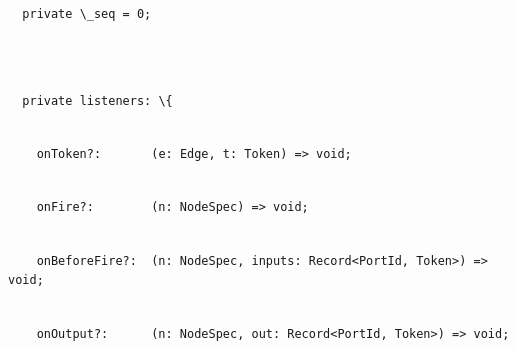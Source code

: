 \documentclass[
]{article}
\newcommand{\passthrough}[1]{#1}
\begin{document}
\passthrough{\lstinline!  !}\passthrough{\lstinline!private!}\passthrough{\lstinline! !}\passthrough{\lstinline!\_seq!}\passthrough{\lstinline! !}\passthrough{\lstinline!=!}\passthrough{\lstinline! !}\passthrough{\lstinline!0;!}\strut \\
\strut \\
\passthrough{\lstinline!  !}\passthrough{\lstinline!private!}\passthrough{\lstinline! !}\passthrough{\lstinline!listeners:!}\passthrough{\lstinline! !}\passthrough{\lstinline!\{!}\strut \\
\passthrough{\lstinline!    !}\passthrough{\lstinline!onToken!}\passthrough{\lstinline!?:!}\passthrough{\lstinline!       !}\passthrough{\lstinline!(e:!}\passthrough{\lstinline! !}\passthrough{\lstinline!Edge,!}\passthrough{\lstinline! !}\passthrough{\lstinline!t:!}\passthrough{\lstinline! !}\passthrough{\lstinline!Token)!}\passthrough{\lstinline! !}\passthrough{\lstinline!=>!}\passthrough{\lstinline! !}\passthrough{\lstinline!void;!}\strut \\
\passthrough{\lstinline!    !}\passthrough{\lstinline!onFire!}\passthrough{\lstinline!?:!}\passthrough{\lstinline!        !}\passthrough{\lstinline!(n:!}\passthrough{\lstinline! !}\passthrough{\lstinline!NodeSpec!}\passthrough{\lstinline!)!}\passthrough{\lstinline! !}\passthrough{\lstinline!=>!}\passthrough{\lstinline! !}\passthrough{\lstinline!void;!}\strut \\
\passthrough{\lstinline!    !}\passthrough{\lstinline!onBeforeFire!}\passthrough{\lstinline!?:!}\passthrough{\lstinline!  !}\passthrough{\lstinline!(n:!}\passthrough{\lstinline! !}\passthrough{\lstinline!NodeSpec!}\passthrough{\lstinline!,!}\passthrough{\lstinline! !}\passthrough{\lstinline!inputs:!}\passthrough{\lstinline! !}\passthrough{\lstinline!Record<!}\passthrough{\lstinline!PortId!}\passthrough{\lstinline!,!}\passthrough{\lstinline! !}\passthrough{\lstinline!Token>)!}\passthrough{\lstinline! !}\passthrough{\lstinline!=>!}\passthrough{\lstinline! !}\passthrough{\lstinline!void;!}\strut \\
\passthrough{\lstinline!    !}\passthrough{\lstinline!onOutput!}\passthrough{\lstinline!?:!}\passthrough{\lstinline!      !}\passthrough{\lstinline!(n:!}\passthrough{\lstinline! !}\passthrough{\lstinline!NodeSpec!}\passthrough{\lstinline!,!}\passthrough{\lstinline! !}\passthrough{\lstinline!out:!}\passthrough{\lstinline! !}\passthrough{\lstinline!Record<!}\passthrough{\lstinline!PortId!}\passthrough{\lstinline!,!}\passthrough{\lstinline! !}\passthrough{\lstinline!Token>)!}\passthrough{\lstinline! !}\passthrough{\lstinline!=>!}\passthrough{\lstinline! !}\passthrough{\lstinline!void;!}\strut \\
\end{document}
